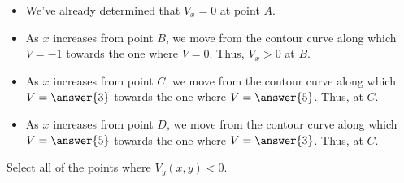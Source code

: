 \documentclass{ximera}
\begin{document}
\begin{exercise}
\begin{exercise}
\begin{hint}
\begin{itemize}
\item We've already determined that $V_x =0$ at point $A$.
\item 
As $x$ increases from point $B$, we move from the contour curve along which $V=-1$ towards the one where $V=0$.  Thus, $V_x>0$ at $B$.
\item As $x$ increases from point $C$, we move from the contour curve along which $V=\answer{3}$ towards the one where $V=\answer{5}$.  Thus,  at  $C$.
\item As $x$ increases from point $D$, we move from the contour curve along which $V=\answer{5}$ towards the one where $V=\answer{3}$.  Thus,  at  $C$.
\end{itemize}

\end{hint}
\end{exercise}  
\begin{exercise}
Select all of the points where $V_y(x,y)<0$.

\begin{selectAll}
\end{selectAll}

\end{exercise}  

\end{exercise}
\end{document}

